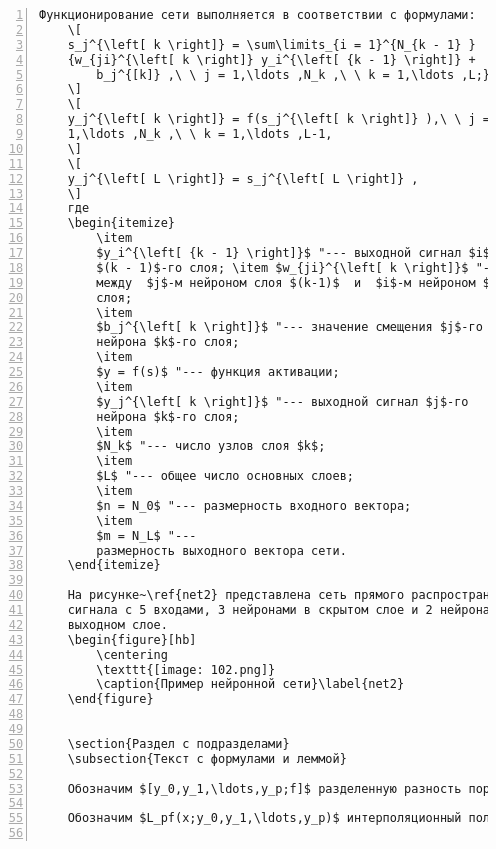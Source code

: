 \documentclass[bachelor, och, pract]{SCWorks}
\begin{document}
\begin{Verbatim}[fontsize=\small, numbers=left]
	Функционирование сети выполняется в соответствии с формулами:
	\[
	s_j^{\left[ k \right]} = \sum\limits_{i = 1}^{N_{k - 1} }
	{w_{ji}^{\left[ k \right]} y_i^{\left[ {k - 1} \right]} +
		b_j^{[k]} ,\ \ j = 1,\ldots ,N_k ,\ \ k = 1,\ldots ,L;}
	\]
	\[
	y_j^{\left[ k \right]} = f(s_j^{\left[ k \right]} ),\ \ j =
	1,\ldots ,N_k ,\ \ k = 1,\ldots ,L-1,
	\]
	\[
	y_j^{\left[ L \right]} = s_j^{\left[ L \right]} ,
	\]
	где
	\begin{itemize}
		\item
		$y_i^{\left[ {k - 1} \right]}$ "--- выходной сигнал $i$-го нейрона
		$(k - 1)$-го слоя; \item $w_{ji}^{\left[ k \right]}$ "--- вес связи
		между  $j$-м нейроном слоя $(k-1)$  и  $i$-м нейроном $k$-го
		слоя;
		\item
		$b_j^{\left[ k \right]}$ "--- значение смещения $j$-го
		нейрона $k$-го слоя;
		\item
		$y = f(s)$ "--- функция активации;
		\item
		$y_j^{\left[ k \right]}$ "--- выходной сигнал $j$-го
		нейрона $k$-го слоя;
		\item
		$N_k$ "--- число узлов слоя $k$;
		\item
		$L$ "--- общее число основных слоев;
		\item
		$n = N_0$ "--- размерность входного вектора;
		\item
		$m = N_L$ "---
		размерность выходного вектора сети.
	\end{itemize}
	
	На рисунке~\ref{net2} представлена сеть прямого распространения
	сигнала с 5 входами, 3 нейронами в скрытом слое и 2 нейронами в
	выходном слое.
	\begin{figure}[hb]
		\centering
		\texttt{[image: 102.png]}
		\caption{Пример нейронной сети}\label{net2}
	\end{figure}
	
	
	\section{Раздел с подразделами}
	\subsection{Текст с формулами и леммой}
	
	Обозначим $[y_0,y_1,\ldots,y_p;f]$ разделенную разность порядка $p$ функции $f$ по узлам $y_0<y_1<\ldots<y_p$.
	
	Обозначим $L_pf(x;y_0,y_1,\ldots,y_p)$ интерполяционный полином Ньютона функции $f$ по узлам $y_0,y_1,\ldots,y_p$:
	

\end{Verbatim}
\end{document}
